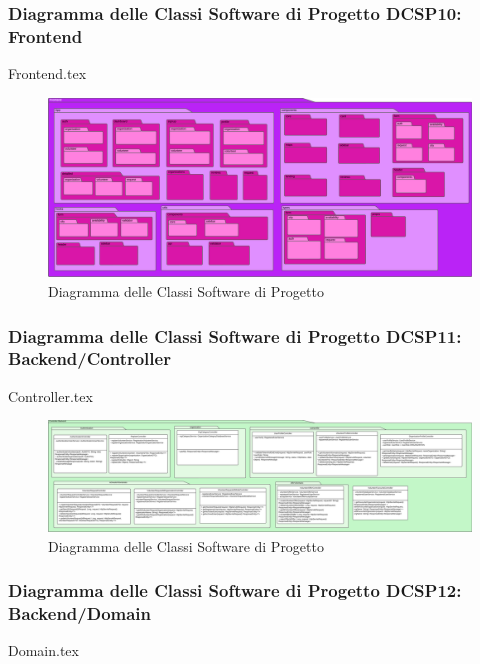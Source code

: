 \documentclass[12pt]{article}
\begin{document}
\subsubsection{Diagramma delle Classi Software di Progetto DCSP10: Frontend}
{Frontend.tex}

\begin{figure}[H]
    \includegraphics[width=\textwidth, height=\textheight,keepaspectratio]{Immagini/DCSP/Iterazione 2/DCSPFrontend.png}
        \caption{Diagramma delle Classi Software di Progetto}
        \label{fig:diagrammaDCSP10}
\end{figure}

\subsubsection{Diagramma delle Classi Software di Progetto DCSP11: Backend/Controller}
{Controller.tex}

\begin{figure}[H]
    \includegraphics[width=\textwidth, height=\textheight,keepaspectratio]{Immagini/DCSP/Iterazione 2/Backend/DCSPController.png}
        \caption{Diagramma delle Classi Software di Progetto}
        \label{fig:diagrammaDCSP11}
\end{figure}

\subsubsection{Diagramma delle Classi Software di Progetto DCSP12: Backend/Domain}
{Domain.tex}
\end{document}

